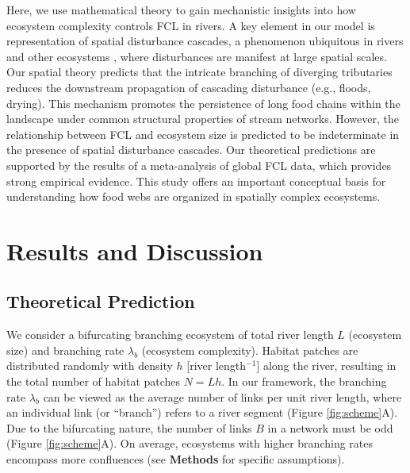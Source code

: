 \documentclass[11pt, class=article, crop=false]{standalone}
\begin{document}
Here, we use mathematical theory to gain mechanistic insights into how ecosystem complexity controls FCL in rivers.
A key element in our model is representation of spatial disturbance cascades, a phenomenon ubiquitous in rivers \citep{swanson_flood_1998, nakamura_disturbance_2000, sarremejane_drought_2021} and other ecosystems \citep{connell_30year_1997, cansler_climate_2014}, where disturbances are manifest at large spatial scales.
Our spatial theory predicts that the intricate branching of diverging tributaries reduces the downstream propagation of cascading disturbance (e.g., floods, drying).
This mechanism promotes the persistence of long food chains within the landscape under common structural properties of stream networks.
However, the relationship between FCL and ecosystem size is predicted to be indeterminate in the presence of spatial disturbance cascades.
Our theoretical predictions are supported by the results of a meta-analysis of global FCL data, which provides strong empirical evidence.
This study offers an important conceptual basis for understanding how food webs are organized in spatially complex ecosystems.

\section{Results and Discussion}

\subsection{Theoretical Prediction}

We consider a bifurcating branching ecosystem of total river length $L$ (ecosystem size) and branching rate $\lambda_b$ (ecosystem complexity).
Habitat patches are distributed randomly with density $h$ [river length$^{-1}$] along the river, resulting in the total number of habitat patches $N = Lh$.
In our framework, the branching rate $\lambda_b$ can be viewed as the average number of links per unit river length, where an individual link (or ``branch'') refers to a river segment (Figure \ref{fig:scheme}A).
Due to the bifurcating nature, the number of links $B$ in a network must be odd (Figure \ref{fig:scheme}A).
On average, ecosystems with higher branching rates encompass more confluences (see \textbf{Methods} for specific assumptions).
\end{document}

